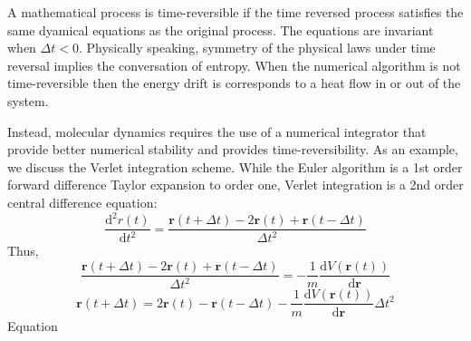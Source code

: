 A mathematical process is time-reversible if the time reversed process satisfies the same dyamical equations as the original process.  The equations are invariant when $\Delta t < 0$.  Physically speaking, symmetry of the physical laws under time reversal implies the conversation of entropy.  When the numerical algorithm is not time-reversible then the energy drift is corresponds to a heat flow in or out of the system.


Instead, molecular dynamics requires the use of a numerical integrator that provide better numerical stability and provides time-reversibility.  As an example, we discuss the Verlet integration scheme\cite{verlet1967_integrator}.  While the Euler algorithm is a 1st order forward difference Taylor expansion to order one,  Verlet integration is a 2nd order central difference equation:
\begin{equation}
	\frac{\mathrm{d}^2 r(t)}
	     {\mathrm{d}t^2}
	= \frac{\bm{r}(t+\Delta t)
	          - 2\bm{r}(t)
		        + \bm{r}(t-\Delta t)}
	       {\Delta t^2}
\end{equation}
Thus,
\begin{equation}
  \frac{\bm{r}(t+\Delta t)
	      - 2\bm{r}(t)
				+ \bm{r}(t-\Delta t)}
	     {\Delta t^2}
	=
	- \frac{1}
	       {m}
		\frac{\mathrm{d} V(\bm{r}(t))}
		     {\mathrm{d} \bm{r}}
\end{equation}
\begin{equation}
	\label{eq:verlet_}
	\bm{r}(t+\Delta t)
	=
	2\bm{r}(t)
	- \bm{r}(t-\Delta t)
	- \frac{1}{m}
		\frac{\mathrm{d} V(\bm{r}(t))}
		     {\mathrm{d} \bm{r}}
		\Delta t^2
\end{equation}
Equation

